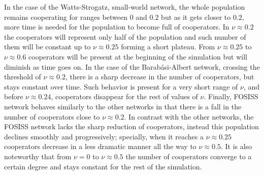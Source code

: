\documentclass[11pt]{article}
\begin{document}
In the case of the Watts-Strogatz, small-world network, the whole
population remains cooperating for ranges between $0$ and $0.2$ but as
it gets closer to $0.2$, more time is needed for the population to
become full of cooperators. In $\nu \approx 0.2$ the cooperators will
represent only half of the population and such number of them will be
constant up to $\nu \approx 0.25$ forming a short plateau. From $\nu
\approx 0.25$ to $\nu \approx 0.6$ cooperators will be present at the
beginning of the simulation but will diminish as time goes on.  In the
case of the Barab\'asi-Albert network, crossing the threshold of $\nu
\approx 0.2$, there is a sharp decrease in the number of cooperators,
but stays constant over time. Such behavior is present for a very
short range of $\nu$, and before $\nu \approx 0.24$, cooperators
disappear for the rest of values of $\nu$. Finally, FOSISS network
behaves similarly to the other networks in that there is a fall in the
number of cooperators close to $\nu \approx 0.2$. In contrast with the
other networks, the FOSISS network lacks the sharp reduction of
cooperators, instead this population declines smoothly and
progressively; specially, when it reaches a $\nu \approx 0.25$
cooperators decrease in a less dramatic manner all the way to
$\nu \approx 0.5$. It is also noteworthy that from $\nu = 0$ to $\nu
\approx 0.5$ the number of cooperators converge to a certain degree
and stays constant for the rest of the simulation.
\end{document}
